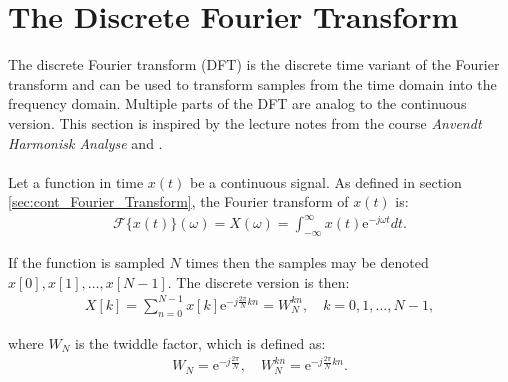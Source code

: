 \section{The Discrete Fourier Transform} \label{sec:DFT}
The discrete Fourier transform (DFT) is the discrete time variant of the Fourier transform and can be used to transform samples from the time domain into the frequency domain. Multiple parts of the DFT are analog to the continuous version. This section is inspired by the lecture notes from the course \textit{Anvendt Harmonisk Analyse} and \cite{page 252-264, FSP}.
\\ \\
Let a function in time $x(t)$ be a continuous signal. As defined in section \ref{sec:cont_Fourier_Transform}, the Fourier transform of $x(t)$ is:
\begin{align*}
\mathcal{F}\{x(t)\}(\omega) = X(\omega) = \int_{-\infty}^\infty x(t)\text{e}^{-j\omega t} dt.
\end{align*}

If the function is sampled $N$ times then the samples may be denoted $x[0],x[1],\dots,x[N-1]$. The discrete version is then:
\begin{align} \label{eq:DFT_vectors}
X[k] = \sum_{n=0}^{N-1} x[k]\text{e}^{-j\frac{2\pi}{N}kn} = W_N^{kn}, \quad k = 0, 1, \dots, N-1,
\end{align}

where $W_N$ is the twiddle factor, which is defined as:
\begin{align*}
W_N = \text{e}^{-j\frac{2 \pi}{N}}, \quad W_N^{kn} = \text{e}^{-j\frac{2 \pi}{N}kn}.
\end{align*}

